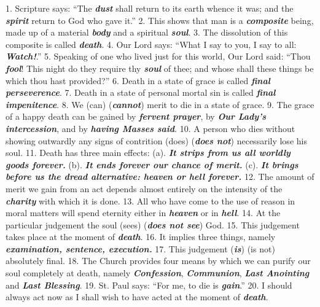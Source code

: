 \documentclass[a4paper,14pt]{memoir}
\newcommand\answer[1]{\textbf{\textit{#1}}}
\begin{document}
1. Scripture says: ``The \answer{dust} shall return to its earth whence it was;  and
the \answer{spirit} return to God who gave it.''
2. This shows that man  is  a  \answer{composite}
being, made up  of  a  material  \answer{body}  and  a  spiritual  \answer{soul}. 
3.  The
dissolution of this composite is called \answer{death}.
4. Our Lord  says:  ``What  I
say to you, I say to all: \answer{Watch!}.''
5. Speaking of one who lived  just  for
this world, Our Lord said: ``Thou \answer{fool}! This  night  do  they  require  thy
\answer{soul} of thee; and whose shall these things be which thou  hast  provided?''
6. Death in a state of grace is called  \answer{final perseverence}. 
7.  Death  in  a  state  of
personal mortal sin is called \answer{final impenitence}.
8. We (can) (\answer{cannot}) merit to  die  in
a state of grace.
9. The grace of a happy death can be gained by \answer{fervent prayer},  by
\answer{Our Lady's intercession}, and by \answer{having Masses said}.
10. A person who dies without showing  outwardly  any
signs of contrition (does) (\answer{does not}) necessarily lose his soul. 
11.  Death
has three main effects: (a).    \answer{It strips from us all worldly goods forever.}
 (b).    \answer{It ends forever our chance of merit.}
 (c).    \answer{It brings before us the dread alternative: heaven or hell forever.}
12. The  amount
of merit we gain from an act depends almost entirely  on  the  intensity  of
the \answer{charity} with which it is done.
13. All  who  have  come  to  the  use  of
reason in moral matters will spend eternity either in \answer{heaven} or  in  \answer{hell}.
14. At the particular judgement the soul (sees)  (\answer{does  not  see})  God.
15.
This judgement takes place at the moment of \answer{death}. 
16.  It  implies  three
things, namely \answer{examination, sentence, execution.
}
17. This judgement (\answer{is})  (is  not)
absolutely final.
18. The Church provides four means by which we can  purify
our soul completely at death, namely \answer{Confession}, \answer{Communion}, \answer{Last Anointing} and \answer{Last Blessing}.  
19.
St. Paul says: ``For me, to die is \answer{gain}.''
20. I should always act now as  I
shall wish to have acted at the moment of \answer{death}.
\end{document}
